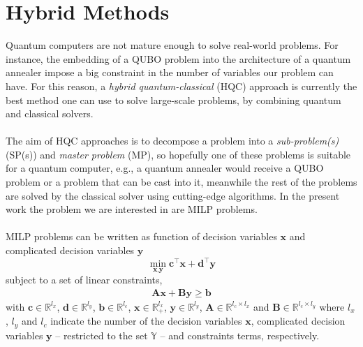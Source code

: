 
\chapter{Hybrid Methods} %

\label{Chapter3} %

Quantum computers are not mature enough to solve real-world problems. For instance, the embedding of a QUBO problem into the architecture of a quantum annealer impose a big constraint in the number of variables our problem can have. For this reason, a \textit{hybrid quantum-classical} (HQC) approach is currently the best method one can use to solve large-scale problems, by combining quantum and classical solvers.\\\\
The aim of HQC approaches is to decompose a problem into a \textit{sub-problem(s)} (SP(s)) and \textit{master problem} (MP), so hopefully one of these problems is suitable for a quantum computer, e.g., a quantum annealer would receive a QUBO problem or a problem that can be cast into it, meanwhile the rest of the problems are solved by the classical solver using cutting-edge algorithms. In the present work the problem we are interested in are MILP problems.\\\\
MILP problems can be written as function of decision variables $\textbf{x}$ and complicated decision variables $\textbf{y}$
\begin{equation}
\label{eq: MILP}
    \min_{\textbf{x},\textbf{y}} \textbf{c}^\intercal\textbf{x} + \textbf{d}^\intercal\textbf{y}
\end{equation}
subject to a set of linear constraints,
\begin{align}
    \textbf{A}\textbf{x} + \textbf{B}\textbf{y} \geq \textbf{b}
\end{align}
with $\textbf{c}\in\mathbb{R}^{l_{x}}$, $\textbf{d}\in\mathbb{R}^{l_{y}}$, $\textbf{b}\in\mathbb{R}^{l_{c}}$, $\textbf{x}\in\mathbb{R}_{+}^{l_{x}}$, $\textbf{y}\in\mathbb{R}^{l_{y}}$, $\textbf{A}\in \mathbb{R}^{l_{c}\times l_{x}}$ and $\textbf{B}\in\mathbb{R}^{l_{c}\times l_{y}}$ where $l_{x}$, $l_{y}$ and $l_{c}$ indicate the number of the decision variables $\textbf{x}$, complicated decision variables $\textbf{y}$ -- restricted to the set $\mathbb{Y}$ -- and constraints terms, respectively. 
